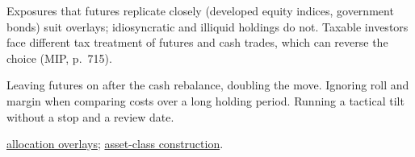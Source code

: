 \begin{qfexample}
 Exposures that futures replicate closely (developed equity indices, government bonds) suit overlays; idiosyncratic and illiquid holdings do not. Taxable investors face different tax treatment of futures and cash trades, which can reverse the choice (MIP, p.~715).

 Leaving futures on after the cash rebalance, doubling the move. Ignoring roll and margin when comparing costs over a long holding period. Running a tactical tilt without a stop and a review date.

 \hyperref[meth:derivative-overlay-allocation]{allocation overlays}; \hyperref[meth:asset-class-portfolio-construction]{asset-class construction}.

\end{qfexample}
